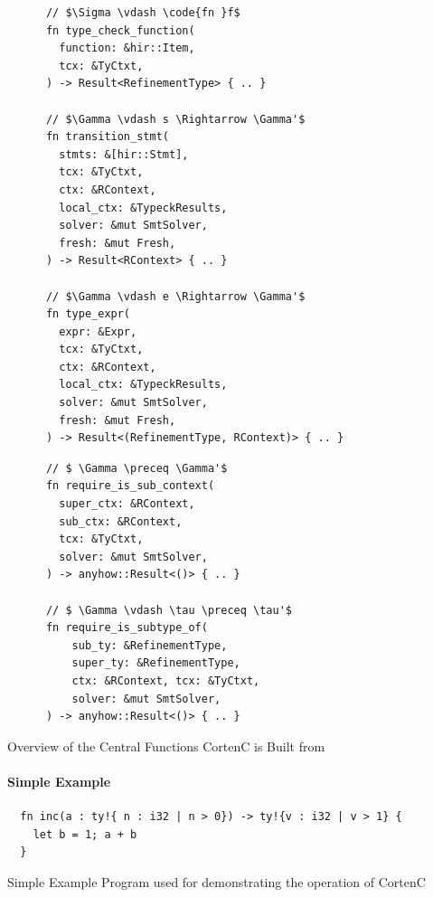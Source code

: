 \documentclass[twoside, english, final]{sdqthesis}
\theoremstyle{definition}
\begin{document}
\begin{listing}[h]
  \begin{minipage}[t]{0.48\linewidth}
    \begin{verbatim}
      // $\Sigma \vdash \code{fn }f$
      fn type_check_function(
        function: &hir::Item,
        tcx: &TyCtxt,
      ) -> Result<RefinementType> { .. }
    
      // $\Gamma \vdash s \Rightarrow \Gamma'$
      fn transition_stmt( 
        stmts: &[hir::Stmt],
        tcx: &TyCtxt,
        ctx: &RContext,
        local_ctx: &TypeckResults,
        solver: &mut SmtSolver,
        fresh: &mut Fresh,
      ) -> Result<RContext> { .. } 
    
      // $\Gamma \vdash e \Rightarrow \Gamma'$ 
      fn type_expr(
        expr: &Expr,
        tcx: &TyCtxt,
        ctx: &RContext,
        local_ctx: &TypeckResults,
        solver: &mut SmtSolver,
        fresh: &mut Fresh,
      ) -> Result<(RefinementType, RContext)> { .. }
    \end{verbatim}
  \end{minipage}
  \begin{minipage}[t]{0.48\linewidth}
    \begin{verbatim}
      // $ \Gamma \preceq \Gamma'$
      fn require_is_sub_context(
        super_ctx: &RContext,
        sub_ctx: &RContext,
        tcx: &TyCtxt,
        solver: &mut SmtSolver,
      ) -> anyhow::Result<()> { .. } 

      // $ \Gamma \vdash \tau \preceq \tau'$
      fn require_is_subtype_of(
          sub_ty: &RefinementType,
          super_ty: &RefinementType,
          ctx: &RContext, tcx: &TyCtxt,
          solver: &mut SmtSolver,
      ) -> anyhow::Result<()> { .. }
    \end{verbatim}
  \end{minipage}
  \caption{Overview of the Central Functions CortenC is Built from}
  \label{lst:architecture-cortenc}
\end{listing}

\paragraph{Simple Example}

\begin{listing}[h]
  \begin{verbatim}
  fn inc(a : ty!{ n : i32 | n > 0}) -> ty!{v : i32 | v > 1} {
    let b = 1; a + b
  }
  \end{verbatim}
  \caption{Simple Example Program used for demonstrating the operation of CortenC}
  \label{lst:simple-example-cortenc}
\end{listing}
\end{document}
